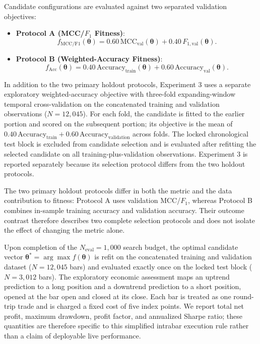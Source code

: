 Candidate configurations are evaluated against two separated validation objectives:
\begin{itemize}
    \item \textbf{Protocol A (MCC/$F_1$ Fitness)}:
    \begin{equation}\label{eq:fitness_protocol_a}
    f_{\mathrm{MCC/F1}}(\boldsymbol{\theta}) = 0.60\,\mathrm{MCC}_{\mathrm{val}}(\boldsymbol{\theta}) + 0.40\,F_{1,\mathrm{val}}(\boldsymbol{\theta}).
    \end{equation}
    \item \textbf{Protocol B (Weighted-Accuracy Fitness)}:
    \begin{equation}\label{eq:fitness_protocol_b}
    f_{\mathrm{Acc}}(\boldsymbol{\theta}) = 0.40\,\mathrm{Accuracy}_{\mathrm{train}}(\boldsymbol{\theta}) + 0.60\,\mathrm{Accuracy}_{\mathrm{val}}(\boldsymbol{\theta}).
    \end{equation}
\end{itemize}

In addition to the two primary holdout protocols, Experiment 3 uses a separate exploratory weighted-accuracy objective with three-fold expanding-window temporal cross-validation on the concatenated training and validation observations ($N=12{,}045$). For each fold, the candidate is fitted to the earlier portion and scored on the subsequent portion; its objective is the mean of $0.40\,\mathrm{Accuracy}_{\mathrm{train}}+0.60\,\mathrm{Accuracy}_{\mathrm{validation}}$ across folds. The locked chronological test block is excluded from candidate selection and is evaluated after refitting the selected candidate on all training-plus-validation observations. Experiment 3 is reported separately because its selection protocol differs from the two holdout protocols.

The two primary holdout protocols differ in both the metric and the data contribution to fitness: Protocol A uses validation MCC/$F_1$, whereas Protocol B combines in-sample training accuracy and validation accuracy. Their outcome contrast therefore describes two complete selection protocols and does not isolate the effect of changing the metric alone.

Upon completion of the $N_{\mathrm{eval}} = 1{,}000$ search budget, the optimal candidate vector $\boldsymbol{\theta}^* = \arg\max f(\boldsymbol{\theta})$ is refit on the concatenated training and validation dataset ($N = 12{,}045$ bars) and evaluated exactly once on the locked test block ($N = 3{,}012$ bars). The exploratory economic assessment maps an uptrend prediction to a long position and a downtrend prediction to a short position, opened at the bar open and closed at its close. Each bar is treated as one round-trip trade and is charged a fixed cost of five index points. We report total net profit, maximum drawdown, profit factor, and annualized Sharpe ratio; these quantities are therefore specific to this simplified intrabar execution rule rather than a claim of deployable live performance.

